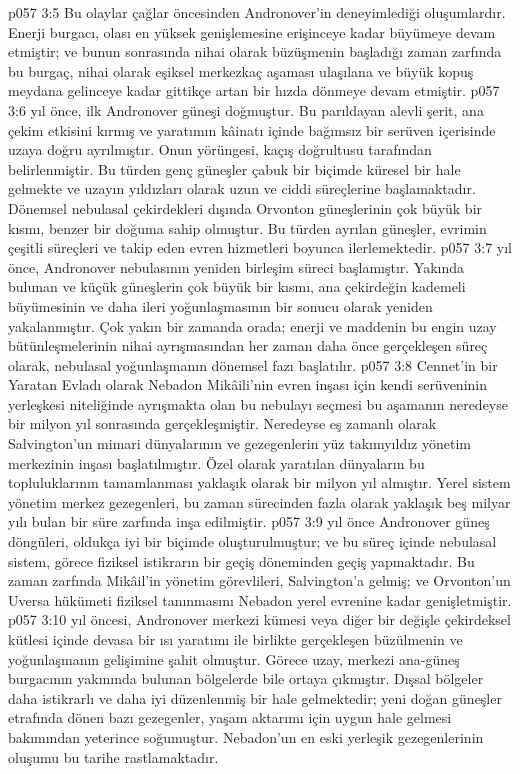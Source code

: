 \vs p057 3:5 Bu olaylar çağlar öncesinden Andronover’in deneyimlediği oluşumlardır. Enerji burgacı, olası en yüksek genişlemesine erişinceye kadar büyümeye devam etmiştir; ve bunun sonrasında nihai olarak büzüşmenin başladığı zaman zarfında bu burgaç, nihai olarak eşiksel merkezkaç aşaması ulaşılana ve büyük kopuş meydana gelinceye kadar gittikçe artan bir hızda dönmeye devam etmiştir.
\vs p057 3:6  yıl önce, ilk Andronover güneşi doğmuştur. Bu parıldayan alevli şerit, ana çekim etkisini kırmış ve yaratımın kâinatı içinde bağımsız bir serüven içerisinde uzaya doğru ayrılmıştır. Onun yörüngesi, kaçış doğrultusu tarafından belirlenmiştir. Bu türden genç güneşler çabuk bir biçimde küresel bir hale gelmekte ve uzayın yıldızları olarak uzun ve ciddi süreçlerine başlamaktadır. Dönemsel nebulasal çekirdekleri dışında Orvonton güneşlerinin çok büyük bir kısmı, benzer bir doğuma sahip olmuştur. Bu türden ayrılan güneşler, evrimin çeşitli süreçleri ve takip eden evren hizmetleri boyunca ilerlemektedir.
\vs p057 3:7  yıl önce, Andronover nebulasının yeniden birleşim süreci başlamıştır. Yakında bulunan ve küçük güneşlerin çok büyük bir kısmı, ana çekirdeğin kademeli büyümesinin ve daha ileri yoğunlaşmasının bir sonucu olarak yeniden yakalanmıştır. Çok yakın bir zamanda orada; enerji ve maddenin bu engin uzay bütünleşmelerinin nihai ayrışmasından her zaman daha önce gerçekleşen süreç olarak, nebulasal yoğunlaşmanın dönemsel fazı başlatılır.
\vs p057 3:8 Cennet’in bir Yaratan Evladı olarak Nebadon Mikâili’nin evren inşası için kendi serüveninin yerleşkesi niteliğinde ayrışmakta olan bu nebulayı seçmesi bu aşamanın neredeyse bir milyon yıl sonrasında gerçekleşmiştir. Neredeyse eş zamanlı olarak Salvington’un mimari dünyalarının ve gezegenlerin yüz takımyıldız yönetim merkezinin inşası başlatılmıştır. Özel olarak yaratılan dünyaların bu topluluklarının tamamlanması yaklaşık olarak bir milyon yıl almıştır. Yerel sistem yönetim merkez gezegenleri, bu zaman sürecinden fazla olarak yaklaşık beş milyar yılı bulan bir süre zarfında inşa edilmiştir.
\vs p057 3:9  yıl önce Andronover güneş döngüleri, oldukça iyi bir biçimde oluşturulmuştur; ve bu süreç içinde nebulasal sistem, görece fiziksel istikrarın bir geçiş döneminden geçiş yapmaktadır. Bu zaman zarfında Mikâil’in yönetim görevlileri, Salvington’a gelmiş; ve Orvonton’un Uversa hükümeti fiziksel tanınmasını Nebadon yerel evrenine kadar genişletmiştir.
\vs p057 3:10  yıl öncesi, Andronover merkezi kümesi veya diğer bir değişle çekirdeksel kütlesi içinde devasa bir ısı yaratımı ile birlikte gerçekleşen büzülmenin ve yoğunlaşmanın gelişimine şahit olmuştur. Görece uzay, merkezi ana\hyp{}güneş burgacının yakınında bulunan bölgelerde bile ortaya çıkmıştır. Dışsal bölgeler daha istikrarlı ve daha iyi düzenlenmiş bir hale gelmektedir; yeni doğan güneşler etrafında dönen bazı gezegenler, yaşam aktarımı için uygun hale gelmesi bakımından yeterince soğumuştur. Nebadon’un en eski yerleşik gezegenlerinin oluşumu bu tarihe rastlamaktadır.
